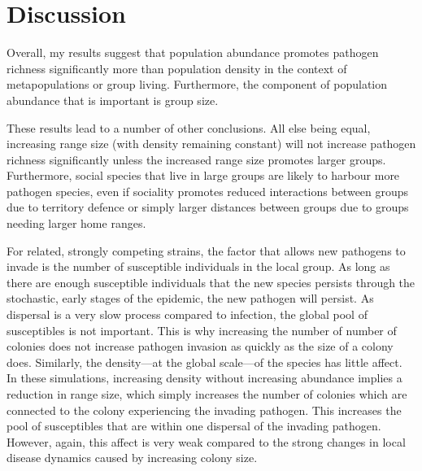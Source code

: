 

\section{Discussion}



Overall, my results suggest that population abundance promotes pathogen richness significantly more than population density in the context of metapopulations or group living.
Furthermore, the component of population abundance that is important is group size.

These results lead to a number of other conclusions.
All else being equal, increasing range size (with density remaining constant) will not increase pathogen richness significantly unless the increased range size promotes larger groups.
Furthermore, social species that live in large groups are likely to harbour more pathogen species, even if sociality promotes reduced interactions between groups due to territory defence or simply larger distances between groups due to groups needing larger home ranges.



For related, strongly competing strains, the factor that allows new pathogens to invade is the number of susceptible individuals in the local group.
As long as there are enough susceptible individuals that the new species persists through the stochastic, early stages of the epidemic, the new pathogen will persist.
As dispersal is a very slow process compared to infection, the global pool of susceptibles is not important. 
This is why increasing the number of number of colonies does not increase pathogen invasion as quickly as the size of a colony does.
Similarly, the density---at the global scale---of the species has little affect.
In these simulations, increasing density without increasing abundance implies a reduction in range size, which simply increases the number of colonies which are connected to the colony experiencing the invading pathogen.
This increases the pool of susceptibles that are within one dispersal of the invading pathogen.
However, again, this affect is very weak compared to the strong changes in local disease dynamics caused by increasing colony size.



